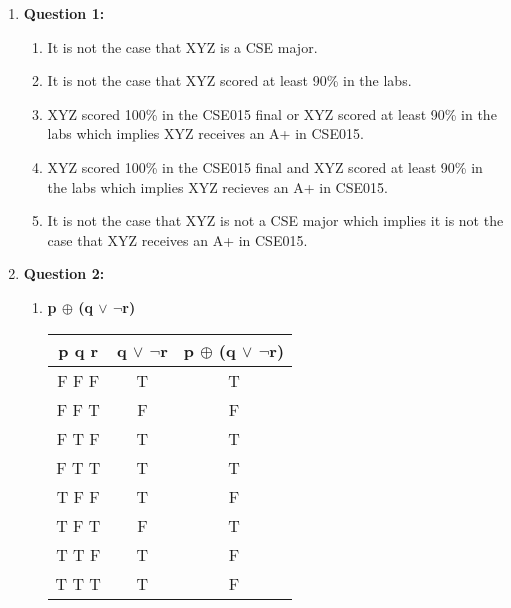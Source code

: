 \documentclass[11pt]{article}
\begin{document}
\begin{enumerate}
\item
\textbf{Question 1:} %
\begin{enumerate}[label=(\alph*)]
\item %
It is not the case that XYZ is a CSE major.

\item %
It is not the case that XYZ scored at least 90\% in the labs. 

\item %
XYZ scored 100\% in the CSE015 final or XYZ scored at least 90\% in the labs which implies XYZ receives an A+ in CSE015.

\item %
XYZ scored 100\% in the CSE015 final and XYZ scored at least 90\% in the labs which implies XYZ recieves an A+ in CSE015.

\item %
It is not the case that XYZ is not a CSE major which implies it is not the case that XYZ receives an A+ in CSE015.
\end{enumerate}

\item
\textbf{Question 2:} %
\begin{enumerate}[label=(\alph*)]
\item %
\textbf{p $\oplus$ (q $\lor$ $\lnot$r)} \\
    \begin{tabular}{c|c|c}
        \textbf{p q r} & \textbf{q $\lor$ $\lnot$r} & \textbf{p $\oplus$ (q $\lor$ $\lnot$r)}\\
        \hline
        F F F & T & T \\
        F F T & F & F \\
        \hline
        F T F & T & T \\
        F T T & T & T \\
        \hline
        T F F & T & F \\
        T F T & F & T \\
        \hline
        T T F & T & F \\
        T T T & T & F \\
    \end{tabular} \\

\textbf{} \\
\textbf{} \\
\textbf{} \\
\textbf{} \\


\end{enumerate}
\end{enumerate}
\end{document}
